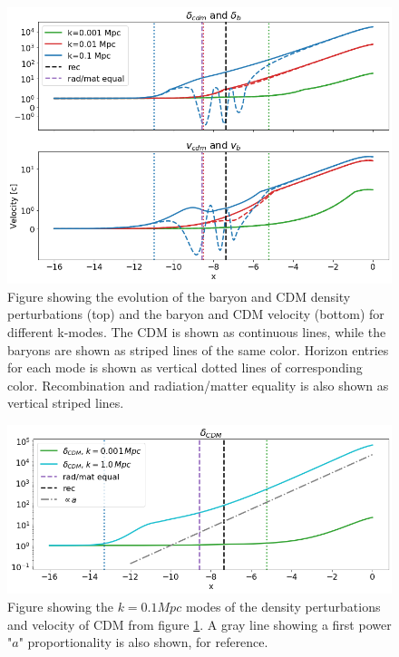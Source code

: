 \documentclass[10pt, a4paper]{article}
\begin{document}
\begin{figure}[H]
    \centering
    \includegraphics[scale=0.45]{../m3_figs/delta_and_v.png}
    \caption{Figure showing the evolution of the baryon and CDM density perturbations (top) and the baryon and CDM velocity (bottom) for different k-modes. The CDM is shown as continuous lines, while the baryons are shown as striped lines of the same color. Horizon entries for each mode is shown as vertical dotted lines of corresponding color. Recombination and radiation/matter equality is also shown as vertical striped lines.}
    \label{fig:delta_and_v}
\end{figure}

\begin{figure}[H]
    \centering
    \includegraphics[scale=0.45]{../m3_figs/delta_and_v_zoomed.png}
    \caption{Figure showing the $k=0.1 Mpc$ modes of the density perturbations and velocity of CDM from figure \ref{fig:delta_and_v}. A gray line showing a first power "$a$" proportionality is also shown, for reference.}
    \label{fig:delta_and_v_zoomed}
\end{figure}
\end{document}
